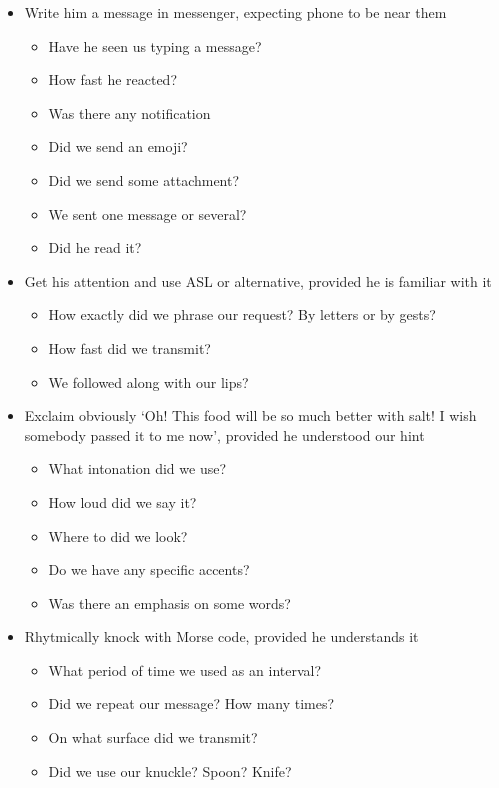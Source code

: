 \documentclass{article}
\begin{document}
\begin{itemize}
                \item Write him a message in messenger, expecting phone to be near them
                \begin{itemize}
                    \item Have he seen us typing a message?
                    \item How fast he reacted?
                    \item Was there any notification
                    \item Did we send an emoji?
                    \item Did we send some attachment?
                    \item We sent one message or several?
                    \item Did he read it?
                \end{itemize}

                \item Get his attention and use ASL or alternative, provided he is familiar with it
                \begin{itemize}
                    \item How exactly did we phrase our request? By letters or by gests?
                    \item How fast did we transmit?
                    \item We followed along with our lips?
                \end{itemize}

                \item Exclaim obviously `Oh! This food will be so much better with salt! I wish somebody passed it to me now', provided he understood our hint
                \begin{itemize}
                    \item What intonation did we use?
                    \item How loud did we say it?
                    \item Where to did we look?
                    \item Do we have any specific accents?
                    \item Was there an emphasis on some words?
                \end{itemize}

                \item Rhytmically knock with Morse code, provided he understands it
                \begin{itemize}
                    \item What period of time we used as an interval?
                    \item Did we repeat our message? How many times?
                    \item On what surface did we transmit?
                    \item Did we use our knuckle? Spoon? Knife?
                \end{itemize}
            \end{itemize}
            
\end{document}
